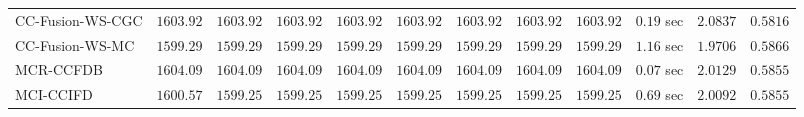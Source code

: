 \begin{table}[H]
\begin{tabular}{lrrrrrrrrrrr}
    CC-Fusion-WS-CGC & $      1603.92$ & $      1603.92$ & $      1603.92$ & $      1603.92$ & $      1603.92$ & $      1603.92$ & $      1603.92$ & $      1603.92$ & $         0.19$ sec    & $       2.0837$  & $       0.5816$ \\ 
     CC-Fusion-WS-MC & $      1599.29$ & $      1599.29$ & $      1599.29$ & $      1599.29$ & $      1599.29$ & $      1599.29$ & $      1599.29$ & $      1599.29$ & $         1.16$ sec    & $       1.9706$  & $       0.5866$ \\ 
\cmidrule{1-1} 
           MCR-CCFDB & $      1604.09$ & $      1604.09$ & $      1604.09$ & $      1604.09$ & $      1604.09$ & $      1604.09$ & $      1604.09$ & $      1604.09$ & $         0.07$ sec    & $       2.0129$  & $       0.5855$ \\ 
\cmidrule{1-1} 
           MCI-CCIFD & $      1600.57$ & $      1599.25$ & $      1599.25$ & $      1599.25$ & $      1599.25$ & $      1599.25$ & $      1599.25$ & $      1599.25$ & $         0.69$ sec    & $       2.0092$  & $       0.5855$ \\ 
\bottomrule
\end{tabular}
\end{table}

